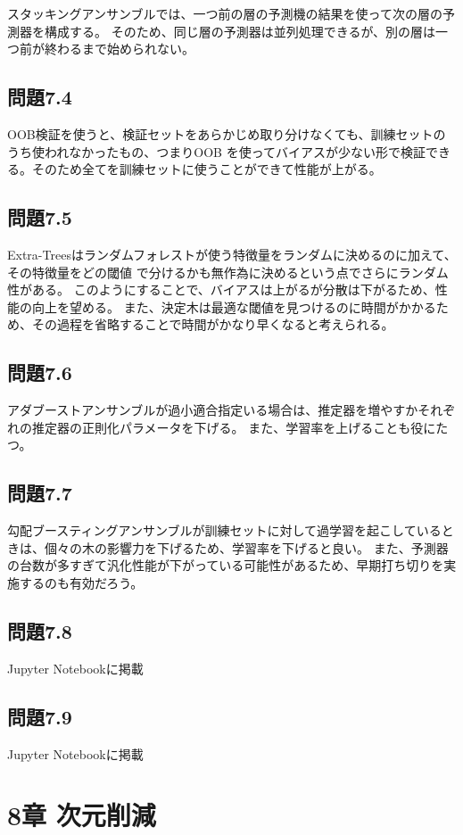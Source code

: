 \documentclass[a4j,twocolumn]{jsarticle}
\begin{document}
スタッキングアンサンブルでは、一つ前の層の予測機の結果を使って次の層の予測器を構成する。
そのため、同じ層の予測器は並列処理できるが、別の層は一つ前が終わるまで始められない。

\subsection{問題7.4}
OOB検証を使うと、検証セットをあらかじめ取り分けなくても、訓練セットのうち使われなかったもの、つまりOOB
を使ってバイアスが少ない形で検証できる。そのため全てを訓練セットに使うことができて性能が上がる。

\subsection{問題7.5}
Extra-Treesはランダムフォレストが使う特徴量をランダムに決めるのに加えて、その特徴量をどの閾値
で分けるかも無作為に決めるという点でさらにランダム性がある。
このようにすることで、バイアスは上がるが分散は下がるため、性能の向上を望める。
また、決定木は最適な閾値を見つけるのに時間がかかるため、その過程を省略することで時間がかなり早くなると考えられる。

\subsection{問題7.6}
アダブーストアンサンブルが過小適合指定いる場合は、推定器を増やすかそれぞれの推定器の正則化パラメータを下げる。
また、学習率を上げることも役にたつ。

\subsection{問題7.7}
勾配ブースティングアンサンブルが訓練セットに対して過学習を起こしているときは、個々の木の影響力を下げるため、学習率を下げると良い。
また、予測器の台数が多すぎて汎化性能が下がっている可能性があるため、早期打ち切りを実施するのも有効だろう。

\subsection{問題7.8}
Jupyter Notebookに掲載


\subsection{問題7.9}
Jupyter Notebookに掲載

\section{8章 次元削減}
\end{document}

